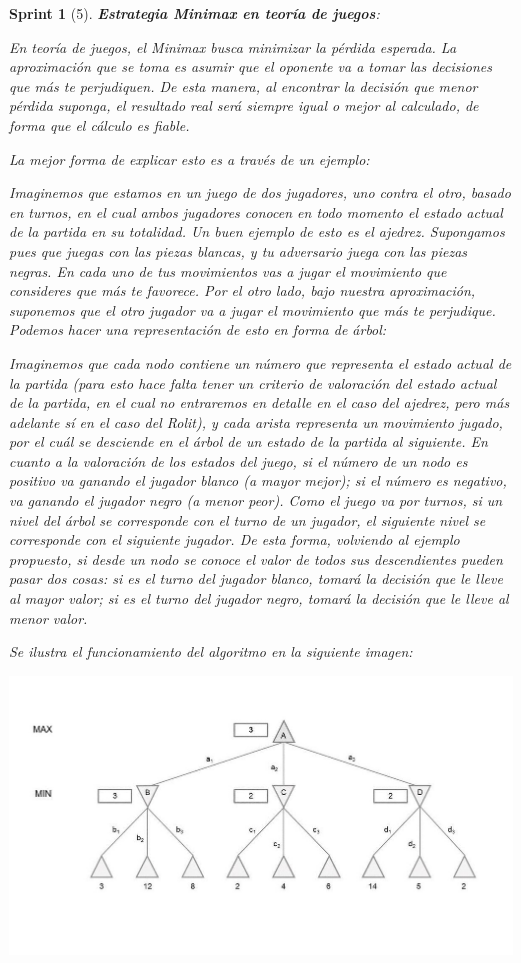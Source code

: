 \documentclass{article}
\theoremstyle{break}
\newtheorem*{sprint}{Sprint}
\begin{document}
\begin{sprint}[5]
\textbf{Estrategia Minimax en teoría de juegos}: 

En teoría de juegos, el Minimax busca minimizar la pérdida esperada. La aproximación que se toma es asumir que el oponente va a tomar las decisiones que más te perjudiquen. De esta manera, al encontrar la decisión que menor pérdida suponga, el resultado real será siempre igual o mejor al calculado, de forma que el cálculo es fiable.

La mejor forma de explicar esto es a través de un ejemplo:

Imaginemos que estamos en un juego de dos jugadores, uno contra el otro, basado en turnos, en el cual ambos jugadores conocen en todo momento el estado actual de la partida en su totalidad. Un buen ejemplo de esto es el ajedrez. Supongamos pues que juegas con las piezas blancas, y tu adversario juega con las piezas negras. En cada uno de tus movimientos vas a jugar el movimiento que consideres que más te favorece. Por el otro lado, bajo nuestra aproximación, suponemos que el otro jugador va a jugar el movimiento que más te perjudique. Podemos hacer una representación de esto en forma de árbol:

Imaginemos que cada nodo contiene un número que representa el estado actual de la partida (para esto hace falta tener un criterio de valoración del estado actual de la partida, en el cual no entraremos en detalle en el caso del ajedrez, pero más adelante sí en el caso del Rolit), y cada arista representa un movimiento jugado, por el cuál se desciende en el árbol de un estado de la partida al siguiente. En cuanto a la valoración de los estados del juego, si el número de un nodo es positivo va ganando el jugador blanco (a mayor mejor); si el número es negativo, va ganando el jugador negro (a menor peor). Como el juego va por turnos, si un nivel del árbol se corresponde con el turno de un jugador, el siguiente nivel se corresponde con el siguiente jugador. De esta forma, volviendo al ejemplo propuesto, si desde un nodo se conoce el valor de todos sus descendientes pueden pasar dos cosas: si es el turno del jugador blanco, tomará la decisión que le lleve al mayor valor; si es el turno del jugador negro, tomará la decisión que le lleve al menor valor. 

Se ilustra el funcionamiento del algoritmo en la siguiente imagen: 

\begin{center}
\centering
\includegraphics[scale=0.5]{minimaxExample.jpg}
\end{center}


\end{sprint}
\end{document}
